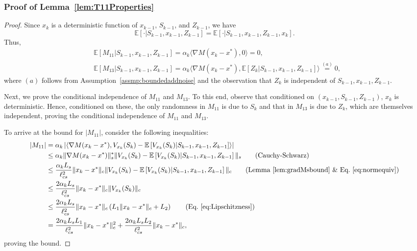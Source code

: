 \documentclass{article}
\newcommand{\lrp}[1]{\left( #1 \right)}
\newcommand{\lrs}[1]{\left[ #1 \right]}
\newcommand{\abs}[1]{\left|{#1}\right|}
\newcommand{\E}[1]{\mathbb{E}\lrs{#1}}
\newcommand{\lcs}{\ell_{cs}}
\newcommand{\xk}{x_k}
\begin{document}
\subsubsection{Proof of Lemma~\ref{lem:T11Properties}}\label{app:proof_lem:T11Properties}
\begin{proof}
Since $x_k$ is a deterministic function of $x_{k-1}$, $S_{k-1}$, and $Z_{k-1}$, we have 
$$\E{\cdot | S_{k-1}, x_{k-1}, Z_{k-1}} = \E{\cdot | S_{k-1}, x_{k-1}, Z_{k-1}, x_k}.$$ Thus, 
\begin{align*}
    &\E{ M_{11} | S_{k-1}, x_{k-1}, Z_{k-1} } = \alpha_k \langle \nabla M(\xk - x^*), 0 \rangle = 0,\\
    &\E{ M_{13} | S_{k-1}, x_{k-1}, Z_{k-1} } = \alpha_k \langle \nabla M(\xk - x^*), \E{Z_k | S_{k-1}, x_{k-1}, Z_{k-1}}\rangle \overset{(a)}{=} 0,
\end{align*}
where $(a)$ follows from Assumption~\ref{assmp:boundedaddnoise} and the observation that  $Z_k$ is independent of $S_{k-1}, x_{k-1}, Z_{k-1}$.

Next, we prove the conditional independence of $M_{11}$ and $M_{13}$. To this end, observe that conditioned on $(x_{k-1}, S_{k-1}, Z_{k-1})$, $x_k$ is deterministic. Hence, conditioned on these, the only randomness in $M_{11}$ is due to $S_k$ and that in $M_{13}$ is due to $Z_k$, which are themselves independent, proving the conditional independence of $M_{11}$ and $M_{13}$.

To arrive at the bound for $|M_{11}|$, consider the following inequalities: 
\begin{align*}
    |M_{11}| 
    &= \alpha_k \abs{\langle \nabla M(\xk - x^*), V_{x_k}(S_k) - \E{V_{x_k}(S_k) | S_{k-1}, x_{k-1}, Z_{k-1}} \rangle}\\
    &\le \alpha_k  \|\nabla M(\xk - x^*)\|^*_s \|V_{x_k}(S_k) - \E{V_{x_k}(S_k) | S_{k-1}, x_{k-1}, Z_{k-1}}\|_s  \tag{Cauchy-Schwarz}\\
    &\le  \frac{\alpha_k L_s}{\lcs^2} \|\xk-x^*\|_c \|V_{\xk}(S_k) -  \E{ V_{\xk}(S_k) | S_{k-1}, x_{k-1}, Z_{k-1}}\|_c \tag{Lemma~\ref{lem:gradMsbound} \& Eq.~\eqref{eq:normequiv}}\\
    &\le \frac{2\alpha_k L_s}{\lcs^2} \|\xk - x^*\|_c\|V_{\xk}(S_k)\|_c\\
    &\le \frac{2\alpha_k L_s}{\lcs^2}\|\xk- x^*\|_c \lrp{L_1\|x_k - x^*\|_c + L_2}\tag{Eq.~\eqref{eq:Lipschitzness}}\\
    &= \frac{2\alpha_k L_s L_1}{\lcs^2}\|\xk- x^*\|^2_c + \frac{2\alpha_k L_s L_2}{\lcs^2}\|\xk-x^*\|_c,
 \end{align*}
proving the bound. 


\end{proof}
\end{document}
